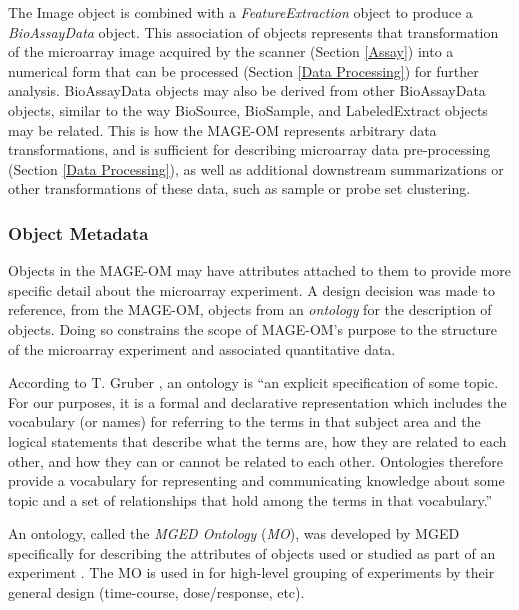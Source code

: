 The Image object is combined with a \emph{FeatureExtraction} object to produce
a \emph{BioAssayData} object.  This association of objects represents that
transformation of the microarray image acquired by the scanner (Section
\ref{Assay}) into a numerical form that can be processed (Section \ref{Data
Processing}) for further analysis.  BioAssayData objects may also be derived
from other BioAssayData objects, similar to the way BioSource, BioSample, and
LabeledExtract objects may be related.  This is how the MAGE-OM represents
arbitrary data transformations, and is sufficient for describing microarray
data pre-processing (Section \ref{Data Processing}), as well as additional
downstream summarizations or other transformations of these data, such as
sample or probe set clustering.

\subsubsection{Object Metadata}
\label{Object Metadata}

Objects in the MAGE-OM may have attributes attached to them to provide
more specific detail about the microarray experiment.  A design decision was
made to reference, from the MAGE-OM, objects from an \emph{ontology} for the
description of objects.  Doing so constrains the scope of MAGE-OM's purpose to
the structure of the microarray experiment and associated quantitative data.

According to T. Gruber \cite{XXX}, an ontology is ``an explicit specification of
some topic. For our purposes, it is a formal and declarative representation
which includes the vocabulary (or names) for referring to the terms in that
subject area and the logical statements that describe what the terms are, how
they are related to each other, and how they can or cannot be related to each
other. Ontologies therefore provide a vocabulary for representing and
communicating knowledge about some topic and a set of relationships that hold
among the terms in that vocabulary.''

An ontology, called the \emph{MGED Ontology} (\emph{MO}), was developed by MGED
specifically for describing the attributes of objects used or studied as part
of an experiment \cite{XXX}.  The MO is used in \dbthesis for high-level
grouping of experiments by their general design (time-course, dose/response,
etc).

